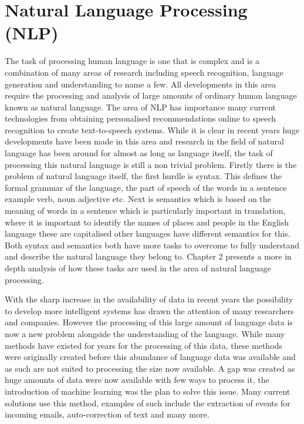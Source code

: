 \section{Natural Language Processing (NLP)}
The task of processing human language is one that is complex and is a combination of many areas of research including speech recognition, language generation and understanding to name a few. All developments in this area require the processing and analysis of large amounts of ordinary human language known as natural language. The area of NLP has importance many current technologies from obtaining personalised recommendations online to speech recognition to create text-to-speech systems. While it is clear in recent years huge developments have been made in this area and research in the field of natural language has been around for almost as long as language itself, the task of processing this natural language is still a non trivial problem. Firstly there is the problem of natural language itself, the first hurdle is syntax. This defines the formal grammar of the language, the part of speech of the words in a sentence example verb, noun adjective etc. Next is semantics which is based on the meaning of words in a sentence which is particularly important in translation, where it is important to identify the names of places and people in the English language these are capitalised other languages have different semantics for this. Both syntax and semantics both have more tasks to overcome to fully understand and describe the natural language they belong to. Chapter 2 presents a more in depth analysis of how these tasks are used in the area of natural language processing. 

With the sharp increase in the availability of data in recent years the possibility to develop more intelligent systems has drawn the attention of many researchers and companies. However the processing of this large amount of language data is now a new problem alongside the understanding of the language. While many methods have existed for years for the processing of this data, these methods were originally created before this abundance of language data was available and as such are not suited to processing the size now available. A gap was created as huge amounts of data were now available with few ways to process it, the introduction of machine learning was the plan to solve this issue. Many current solutions use this method, examples of such include the extraction of events for incoming emails, auto-correction of text and many more.

